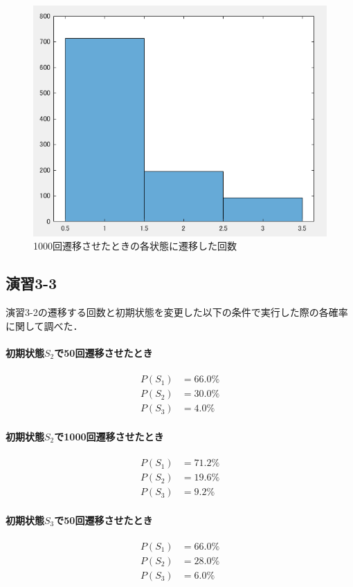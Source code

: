 \documentclass[documentclass]{jsarticle}
\begin{document}
\begin{figure}[H]
  \begin{center}
    \includegraphics*[scale=0.6]{figure/3-2.png}
  \end{center}
  \caption{1000回遷移させたときの各状態に遷移した回数}
  \label{fig:3-2}
\end{figure}

\subsection*{演習3-3}
演習3-2の遷移する回数と初期状態を変更した以下の条件で実行した際の各確率に関して調べた．
\paragraph*{初期状態$S_2$で50回遷移させたとき}
\begin{align*}
 P(S_1) &= 66.0\%\\
 P(S_2) &= 30.0\%\\
 P(S_3) &= 4.0\%
\end{align*}
\paragraph*{初期状態$S_2$で1000回遷移させたとき}
\begin{align*}
  P(S_1) &= 71.2\%\\
  P(S_2) &= 19.6\%\\
  P(S_3) &= 9.2\%
 \end{align*}
\paragraph*{初期状態$S_3$で50回遷移させたとき}
\begin{align*}
  P(S_1) &= 66.0\%\\
  P(S_2) &= 28.0\%\\
  P(S_3) &= 6.0\%
 \end{align*}
\end{document}
